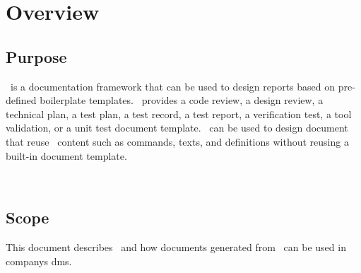 
\section{Overview}
\subsection{Purpose}%
\adAutoDoc\ is a documentation framework that can be used to design reports
based on pre-defined boilerplate templates. \adAutoDoc\ provides a code review,
a design review, a technical plan, a test plan, a test record, a test report,
a verification test, a tool validation, or a unit test document template.
\adAutoDoc\ can be used to design document that reuse \adAutoDoc\ content such
as commands, texts, and definitions without reusing a built-in document
template.

\tlcVspace\

%



\subsection{Scope}
This document describes \adAutoDoc\ and how documents generated from
\adAutoDoc\ can be used in \glspl{company} \gls{dms}.


